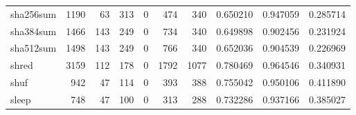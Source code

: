 \begin{tabular}{lrrrrrrrrr}
sha256sum &                                               1190 &                                                 63 &                                                313 &                                                  0 &                                                474 &                                                340 &                                           0.650210 &                               0.947059 &                             0.285714 \\
sha384sum &                                               1466 &                                                143 &                                                249 &                                                  0 &                                                734 &                                                340 &                                           0.649898 &                               0.902456 &                             0.231924 \\
sha512sum &                                               1498 &                                                143 &                                                249 &                                                  0 &                                                766 &                                                340 &                                           0.652036 &                               0.904539 &                             0.226969 \\
shred     &                                               3159 &                                                112 &                                                178 &                                                  0 &                                               1792 &                                               1077 &                                           0.780469 &                               0.964546 &                             0.340931 \\
shuf      &                                                942 &                                                 47 &                                                114 &                                                  0 &                                                393 &                                                388 &                                           0.755042 &                               0.950106 &                             0.411890 \\
sleep     &                                                748 &                                                 47 &                                                100 &                                                  0 &                                                313 &                                                288 &                                           0.732286 &                               0.937166 &                             0.385027 \\

\end{tabular}
